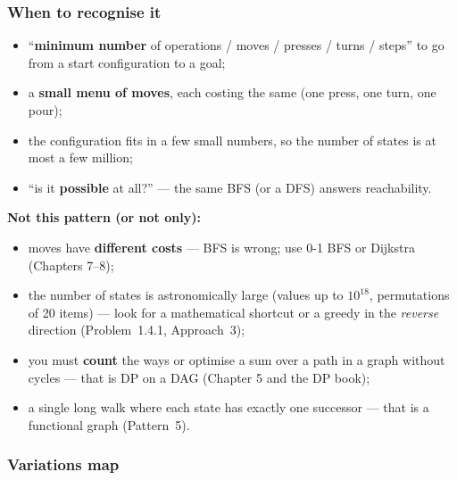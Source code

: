 \subsubsection*{When to recognise it}

\begin{itemize}[leftmargin=*]
    \item ``\textbf{minimum number} of operations / moves / presses / turns / steps'' to go from a start configuration to a goal;
    \item a \textbf{small menu of moves}, each costing the same (one press, one turn, one pour);
    \item the configuration fits in a few small numbers, so the number of states is at most a few million;
    \item ``is it \textbf{possible} at all?'' --- the same BFS (or a DFS) answers reachability.
\end{itemize}
\textbf{Not this pattern (or not only):}
\begin{itemize}[leftmargin=*]
    \item moves have \textbf{different costs} --- BFS is wrong; use 0-1 BFS or Dijkstra (Chapters 7--8);
    \item the number of states is astronomically large (values up to $10^{18}$, permutations of 20 items) --- look for a mathematical shortcut or a greedy in the \emph{reverse} direction (Problem~1.4.1, Approach~3);
    \item you must \textbf{count} the ways or optimise a sum over a path in a graph without cycles --- that is DP on a DAG (Chapter 5 and the DP book);
    \item a single long walk where each state has exactly one successor --- that is a functional graph (Pattern~5).
\end{itemize}

\subsubsection*{Variations map}

